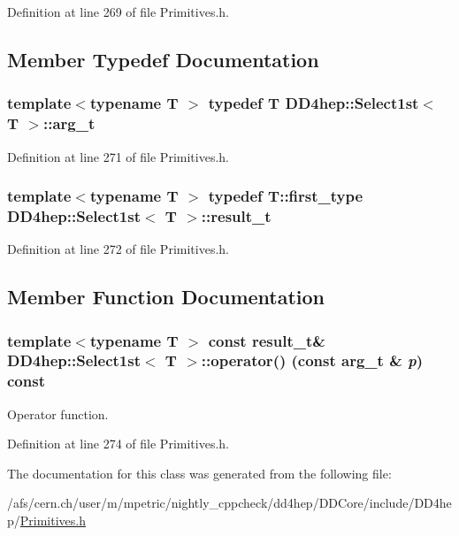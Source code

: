 Definition at line 269 of file Primitives.h.

\subsection{Member Typedef Documentation}
\hypertarget{class_d_d4hep_1_1_select1st_a271f38874bb7bcaf5867dc6d4ad356d1}{
\subsubsection[{arg\_\-t}]{\setlength{\rightskip}{0pt plus 5cm}template$<$typename T $>$ typedef {\bf T} {\bf DD4hep::Select1st}$<$ {\bf T} $>$::{\bf arg\_\-t}}}
\label{class_d_d4hep_1_1_select1st_a271f38874bb7bcaf5867dc6d4ad356d1}


Definition at line 271 of file Primitives.h.\hypertarget{class_d_d4hep_1_1_select1st_a39139f045fd65227afbed9a441a5eaea}{
\subsubsection[{result\_\-t}]{\setlength{\rightskip}{0pt plus 5cm}template$<$typename T $>$ typedef T::first\_\-type {\bf DD4hep::Select1st}$<$ {\bf T} $>$::{\bf result\_\-t}}}
\label{class_d_d4hep_1_1_select1st_a39139f045fd65227afbed9a441a5eaea}


Definition at line 272 of file Primitives.h.

\subsection{Member Function Documentation}
\hypertarget{class_d_d4hep_1_1_select1st_a62ebacc3c81d9e27996e7a7f47f8d92d}{
\subsubsection[{operator()}]{\setlength{\rightskip}{0pt plus 5cm}template$<$typename T $>$ const {\bf result\_\-t}\& {\bf DD4hep::Select1st}$<$ {\bf T} $>$::operator() (const {\bf arg\_\-t} \& {\em p}) const}}
\label{class_d_d4hep_1_1_select1st_a62ebacc3c81d9e27996e7a7f47f8d92d}


Operator function. 

Definition at line 274 of file Primitives.h.

The documentation for this class was generated from the following file:\begin{DoxyCompactItemize}
\item 
/afs/cern.ch/user/m/mpetric/nightly\_\-cppcheck/dd4hep/DDCore/include/DD4hep/\hyperlink{_primitives_8h}{Primitives.h}\end{DoxyCompactItemize}
